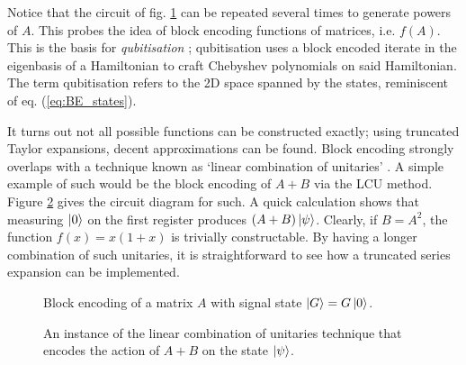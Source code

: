 \documentclass{article}
\begin{document}
Notice that the circuit of fig. \ref{fig:BE_A} can be repeated several times to generate powers of $A$. This probes the idea of block encoding functions of matrices, i.e. $f(A)$. This is the basis for \emph{qubitisation} \cite{LC19}; qubitisation uses a block encoded iterate in the eigenbasis of a Hamiltonian to craft Chebyshev polynomials on said Hamiltonian. The term qubitisation refers to the 2D space spanned by the states, reminiscent of eq. (\ref{eq:BE_states}).

It turns out not all possible functions can be constructed exactly; using truncated Taylor expansions, decent approximations can be found. Block encoding strongly overlaps with a technique known as `linear combination of unitaries' \cite{CW12}. A simple example of such would be the block encoding of $A + B$ via the \textsc{LCU} method. Figure \ref{fig:LCU} gives the circuit diagram for such. A quick calculation shows that measuring $\ket{0}$ on the first register produces $(A+B)\ket{\psi}$. Clearly, if $B=A^2$, the function $f(x)=x(1+x)$ is trivially constructable. By having a longer combination of such unitaries, it is straightforward to see how a truncated series expansion can be implemented.

\begin{figure}[h!]
    \centering
    \caption{Block encoding of a matrix $A$ with signal state $\ket{G} = G\ket{0}$.}
    \label{fig:BE_A}
\end{figure}

\begin{figure}[h!]
    \centering
    \caption{An instance of the linear combination of unitaries technique that encodes the action of $A+B$ on the state $\ket{\psi}$.}
    \label{fig:LCU}
\end{figure}
\end{document}
